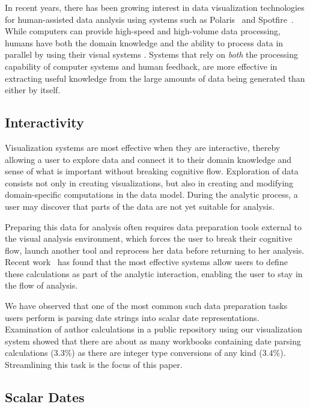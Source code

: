 In recent years, there has been growing interest in data visualization technologies for human-assisted data analysis using systems such as Polaris~\cite{Stolte:2008} and Spotfire~\cite{Ahlberg:1996}. While computers can provide high-speed and high-volume data processing, humans have both the domain knowledge and the ability to process data in parallel by using their visual systems \cite{Cleveland.McGill1984,Mackinlay:1986}. 
Systems that rely on \emph{both} the processing capability of computer systems and human feedback, are more effective in extracting useful knowledge from the large amounts of data being generated than either by itself.

\subsection{Interactivity}
Visualization systems are most effective when they are interactive, thereby allowing a user to explore data and connect it to their domain knowledge and sense of what is important without breaking cognitive flow. 
Exploration of data consists not only in creating visualizations, but also in creating and modifying domain-specific computations in the data model. 
During the analytic process, a user may discover that parts of the data are not yet suitable for analysis. 

Preparing this data for analysis often requires data preparation tools external to the visual analysis environment, which forces the user to break their cognitive flow, launch another tool and reprocess her data before returning to her analysis. 
Recent work~\cite{Morton:2012} has found that the most effective systems allow users to define these calculations as part of the analytic interaction, enabling the user to stay in the flow of analysis.

We have observed that one of the most common such data preparation tasks users perform is parsing date strings into scalar date representations.
Examination of author calculations in a public repository using our
visualization system showed that there are about as many workbooks containing date parsing calculations ($3.3\%$) as there are
integer type conversions of any kind ($3.4\%$).
Streamlining this task is the focus of this paper.

\subsection{Scalar Dates}

